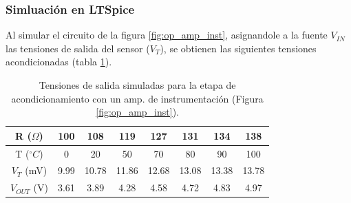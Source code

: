 \documentclass[journal,trans]{IEEEtran}
\begin{document}
\subsubsection{Simluación en LTSpice}
Al simular el circuito de la figura \ref{fig:op_amp_inst}, asignandole a la fuente $V_{IN}$ las tensiones de salida del sensor ($V_{T}$), se obtienen las siguientes tensiones acondicionadas (tabla \ref{tab:tensiones_salida_simuladas_instr}).

\begin{table}[htb]
    \begin{center}
        \caption{Tensiones de salida simuladas para la etapa de acondicionamiento con un amp. de instrumentación (Figura \ref{fig:op_amp_inst}).}
        \label{tab:tensiones_salida_simuladas_instr}
        \begin{tabular}{c | c | c | c | c | c | c | c}
            \hline
            R ($\Omega$) & 100 & 108 & 119 & 127 & 131 & 134 & 138 \\
            \hline
            T ($^{\circ}C$) & 0 & 20 & 50 & 70 & 80 & 90 & 100 \\
            \hline
            $V_{T}$ (mV) & 9.99 & 10.78 & 11.86 & 12.68 & 13.08 & 13.38 & 13.78 \\
            \hline
            $V_{OUT}$ (V) & 3.61 & 3.89 & 4.28 & 4.58 & 4.72 & 4.83 & 4.97 \\
            \hline
        \end{tabular}
    \end{center}
\end{table}





%
%
%
\end{document}
